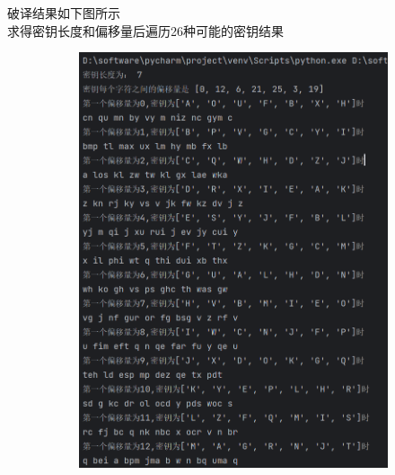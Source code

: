         破译结果如下图所示\\
        求得密钥长度和偏移量后遍历26种可能的密钥结果
        \begin{figure}[htbp]
            \centering 
            \begin{subfigure}[b]{0.4\textwidth}
                \includegraphics[width=\textwidth]{images/vigenere2_result_1.1.png}
                \label{fig:subfig1}
            \end{subfigure}
            \hfill
            \begin{subfigure}[b]{0.5\textwidth}

\end{subfigure}
\end{figure}

